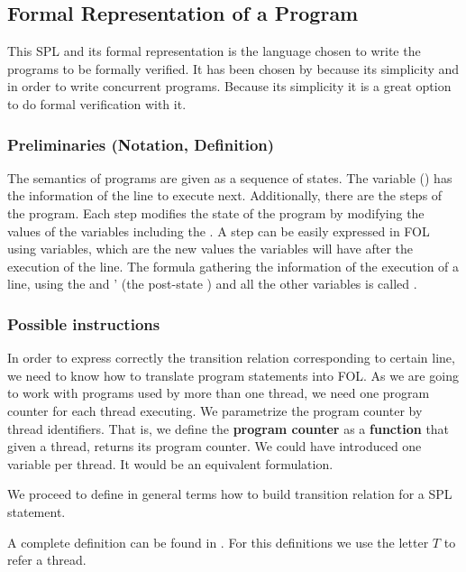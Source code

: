 \subsection{Formal Representation of a Program}

This \gls{SPL} and its formal representation is the language chosen to write the programs to be formally verified.
%
It has been chosen by \citep{thesisAle} because its simplicity and  in order to write concurrent programs. 
%
Because its simplicity it is a great option to do formal verification with it.


\subsubsection{Preliminaries (Notation, Definition)}

The semantics of programs are given as a sequence of states.
%
The \pc\; variable () has the information of the line to execute next. 
%
Additionally, there are the steps of the program. Each step modifies the state of the program by modifying the values of the variables including the \pc.
%
A step can be easily expressed in \gls{FOL} using  variables, which are the new values the variables will have after the execution of the line.
%
The formula gathering the information of the execution of a line, using the \pc and \pc' (the post-state \pc) and all the other variables is called .


\subsubsection{Possible instructions}
%
In order to express correctly the transition relation corresponding to certain line, we need to know how to translate program statements into \gls{FOL}.
%
As we are going to work with programs used by more than one thread, we need one program counter for each thread executing.
%
We parametrize the program counter by thread identifiers. 
%
That is, we define the \textbf{program counter} as a \textbf{function} that given a thread, returns its program counter. 
%
We could have introduced one variable per thread.
%
It would be an equivalent formulation. 


We proceed to define in general terms how to build transition relation for a \gls{SPL} statement.
%

%
A complete definition can be found in \cite{SPL}.
%
For this definitions we use the letter $T$ to refer a thread.
%


